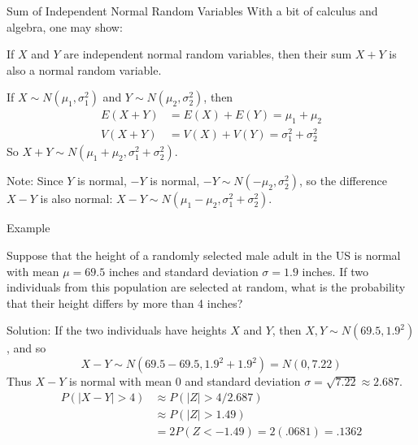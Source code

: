 \documentclass[handout]{beamer}
\begin{document}
\begin{frame}{Sum of Independent Normal Random Variables}
With a bit of calculus and algebra, one may show:
\begin{block}{}
If $X$ and $Y$ are independent normal random variables, 
then their sum $X+Y$ is also a normal random variable.
\end{block}
\pause If $X\sim N(\mu_1,\sigma_1^2)$ and $Y\sim N(\mu_2,\sigma_2^2)$, then
\begin{align*}
E(X+Y)&=E(X)+E(Y)=\mu_1+\mu_2 \\
V(X+Y)&=V(X)+V(Y)=\sigma_1^2+\sigma_2^2
\end{align*}
So $X+Y\sim N(\mu_1+\mu_2,\sigma_1^2+\sigma_2^2)$.

\vspace{.2cm}
\pause Note: Since $Y$ is normal, $-Y$ is normal, $-Y\sim N(-\mu_2,\sigma_2^2)$, so the difference $X-Y$ is also normal: $X-Y\sim N(\mu_1-\mu_2,\sigma_1^2+\sigma_2^2)$.

\end{frame}


\begin{frame}{Example}
\begin{block}{}
Suppose that the height of a randomly selected male adult in the US is normal with mean $\mu=69.5$ inches and standard deviation $\sigma=1.9$ inches. If two individuals from this population are selected at random, what is the probability that their height differs by more than 4 inches?
\end{block}
\pause Solution: If the two individuals have heights $X$ and $Y$, then $X, Y\sim N(69.5,1.9^2)$, and so $$X-Y \sim N(69.5-69.5, 1.9^2+1.9^2) = N(0,7.22)$$
\pause Thus $X-Y$ is normal with mean 0 and standard deviation $\sigma=\sqrt{7.22}\approx 2.687$.
\pause \begin{align*}
P(|X-Y| > 4) &\approx P(|Z| > 4/2.687) \\
&\approx P(|Z| > 1.49) \\
&= 2P(Z<-1.49) = 2(.0681) = .1362
\end{align*}
\end{frame}
\end{document}
